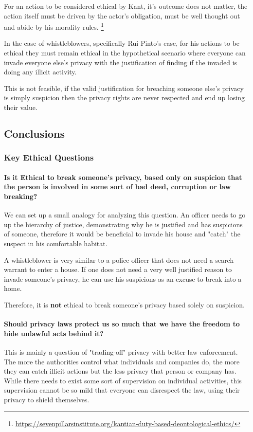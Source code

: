     For an action to be considered ethical by Kant, it's outcome does not matter, the action itself must be driven by the actor's obligation, must be well thought out and abide by his morality rules.
    \footnote{\url{https://sevenpillarsinstitute.org/kantian-duty-based-deontological-ethics/}}

    In the case of whistleblowers, specifically Rui Pinto's case, for his actions to be ethical they must remain ethical in the hypothetical scenario where everyone can invade everyone else's privacy with the justification of finding if the invaded is doing any illicit activity.
    
    This is not feasible, if the valid justification for breaching someone else's privacy is simply suspicion then the privacy rights are never respected and end up losing their value.

    
\subsection{Conclusions}
    \subsubsection{Key Ethical Questions}

    \paragraph{Is it Ethical to break someone's privacy, based only on suspicion that the person is involved in some sort of bad deed, corruption or law breaking?}
    We can set up a small analogy for analyzing this question.
    An officer needs to go up the hierarchy of justice, demonstrating why he is justified and has suspicions of someone, therefore it would be beneficial to invade his house and "catch" the suspect in his comfortable habitat.
    
    A whistleblower is very similar to a police officer that does not need a search warrant to enter a house.
    If one does not need a very well justified reason to invade someone's privacy, he can use his suspicions as an excuse to break into a home.
    
    Therefore, it is \textbf{not} ethical to break someone's privacy based solely on suspicion.

    \paragraph{Should privacy laws protect us so much that we have the freedom to hide unlawful acts behind it?}
    This is mainly a question of "trading-off" privacy with better law enforcement.
    The more the authorities control what individuals and companies do, the more they can catch illicit actions but the less privacy that person or company has.
    While there needs to exist some sort of supervision on individual activities, this supervision cannot be so mild that everyone can disrespect the law, using their privacy to shield themselves.

